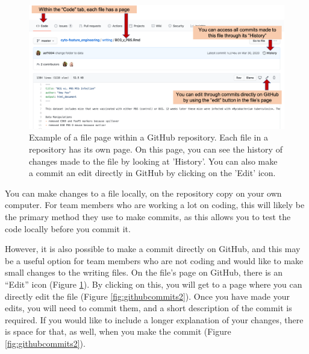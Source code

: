 \documentclass[]{tufte-book}
\begin{document}
\begin{figure}
\includegraphics[width=\textwidth]{figures/github_commits1} \caption[Example of a file page within a GitHub repository]{Example of a file page within a GitHub repository. Each file in a repository has its own page. On this page, you can see the history of changes made to the file by looking at 'History'. You can also make a commit an edit directly in GitHub by clicking on the 'Edit' icon.}\label{fig:githubcommits1}
\end{figure}

You can make changes to a file locally, on the repository copy on your own computer.
For team members who are working a lot on coding, this will likely be the primary
method they use to make commits, as this allows you to test the code locally before
you commit it.

However, it is also possible to make a commit directly on GitHub, and this may be a
useful option for team members who are not coding and would like to make small changes
to the writing files. On the file's page on GitHub, there is an ``Edit'' icon
(Figure \ref{fig:githubcommits1}). By clicking on this, you will get to a page where you
can directly edit the file (Figure \ref{fig:githubcommits2}). Once you have made your
edits, you will need to commit them, and a short description of the commit is required.
If you would like to include a longer explanation of your changes, there is space for
that, as well, when you make the commit (Figure \ref{fig:githubcommits2}).
\end{document}
